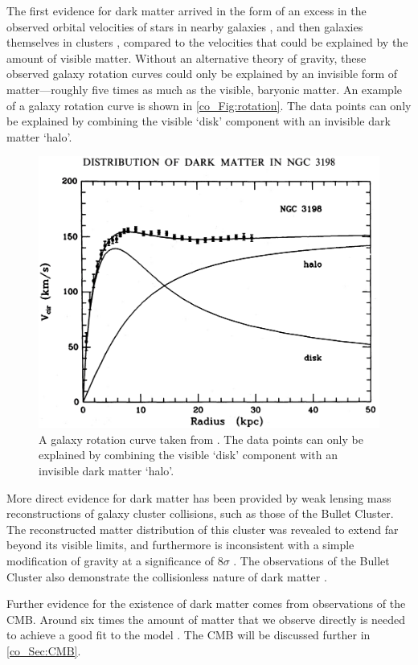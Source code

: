 The first evidence for dark matter arrived in the form of an excess in the observed orbital velocities of stars in nearby galaxies \citep{Kapteyn1922}, and then galaxies themselves in clusters \citep{Zwicky1933,Zwicky1937}, compared to the velocities that could be explained by the amount of visible matter. Without an alternative theory of gravity, these observed galaxy rotation curves could only be explained by an invisible form of matter---roughly five times as much as the visible, baryonic matter. An example of a galaxy rotation curve is shown in \autoref{co_Fig:rotation}. The data points can only be explained by combining the visible `disk' component with an invisible dark matter `halo'.

\begin{figure}
\centering
\includegraphics[width=.8\textwidth]{rotation}
\caption{A galaxy rotation curve taken from \citet{vanAlbada1985}. The data points can only be explained by combining the visible `disk' component with an invisible dark matter `halo'.}
\label{co_Fig:rotation}
\end{figure}

More direct evidence for dark matter has been provided by weak lensing mass reconstructions of galaxy cluster collisions, such as those of the Bullet Cluster. The reconstructed matter distribution of this cluster was revealed to extend far beyond its visible limits, and furthermore is inconsistent with a simple modification of gravity at a significance of $8\sigma$ \citep{Clowe2004, Clowe2006}. The observations of the Bullet Cluster also demonstrate the collisionless nature of dark matter \citep{Markevitch2004}.

Further evidence for the existence of dark matter comes from observations of the CMB. Around six times the amount of matter that we observe directly is needed to achieve a good fit to the \lcdm{} model \citep{Planck2018VI}. The CMB will be discussed further in \autoref{co_Sec:CMB}.

